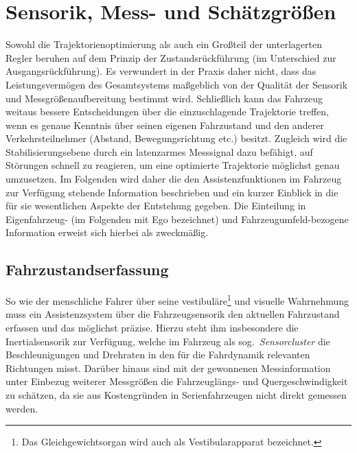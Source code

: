 \section{Sensorik, Mess- und Schätzgrößen}
Sowohl die Trajektorienoptimierung als auch ein Großteil der unterlagerten Regler beruhen auf dem Prinzip der Zustandsrückführung (im Unterschied zur Ausgangsrückführung). Es verwundert in der Praxis daher nicht, dass das Leistungsvermögen des Gesamtsystems maßgeblich von der Qualität der Sensorik und Messgrößenaufbereitung bestimmt wird. Schließlich kann das Fahrzeug weitaus bessere Entscheidungen über die einzuschlagende Trajektorie treffen, wenn es genaue Kenntnis über seinen eigenen Fahrzustand und den anderer Verkehrsteilnehmer (Abstand, Bewegungsrichtung etc.) besitzt. Zugleich wird die Stabilisierungsebene durch ein latenzarmes Messsignal dazu befähigt, auf Störungen schnell zu reagieren, um eine optimierte Trajektorie möglichst genau umzusetzen. Im Folgenden wird daher die den Assistenzfunktionen im Fahrzeug zur Verfügung stehende Information beschrieben und ein kurzer Einblick in die für sie wesentlichen Aspekte der Entstehung gegeben. Die Einteilung in Eigenfahrzeug- (im Folgenden mit Ego bezeichnet) und Fahrzeugumfeld-bezogene Information erweist sich hierbei als zweckmäßig.

\label{sec:sensoren} %

\subsection{Fahrzustandserfassung} \label{sec:eigenfahrzustandserfassung}
So wie der menschliche Fahrer über seine vestibuläre\footnote{Das Gleichgewichtsorgan wird auch als Vestibularapparat bezeichnet.} und visuelle Wahrnehmung muss ein Assistenzsystem über die Fahrzeugsensorik den aktuellen Fahrzustand erfassen und das möglichst präzise. Hierzu steht ihm insbesondere die Inertialsensorik zur Verfügung, welche im Fahrzeug als sog.\ \emph{Sensorcluster} die Beschleunigungen und Drehraten in den für die Fahrdynamik relevanten Richtungen misst. Darüber hinaus sind mit der gewonnenen Messinformation unter Einbezug weiterer Messgrößen die Fahrzeuglängs- und Quergeschwindigkeit zu schätzen, da sie aus Kostengründen in Serienfahrzeugen nicht direkt gemessen werden.

